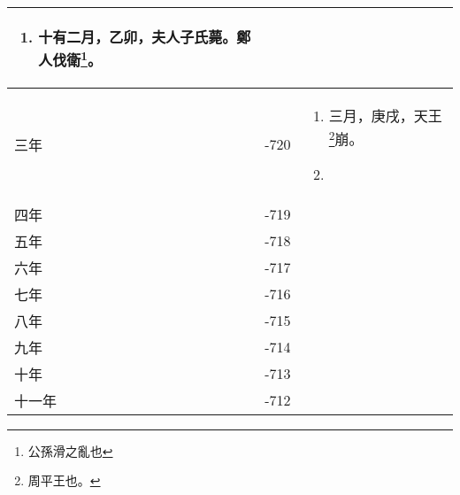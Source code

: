 \begin{longtable}{|>{\centering\scriptsize}m{2em}|>{\centering\scriptsize}m{1.3em}|>{\centering}m{8.8em}|}
\begin{enumerate}
  \item 十有二月，乙卯，夫人子氏薨。鄭人伐衛\footnote{公孫滑之亂也}。
  \end{enumerate} \tabularnewline\hline
  三年 & -720 & \begin{enumerate}
    \tiny
  \item 三月，庚戌，天王\footnote{周平王也。}崩。
  \item 
  \end{enumerate} \tabularnewline\hline
  四年 & -719 & \tabularnewline\hline
  五年 & -718 & \tabularnewline\hline
  六年 & -717 & \tabularnewline\hline
  七年 & -716 & \tabularnewline\hline
  八年 & -715 & \tabularnewline\hline
  九年 & -714 & \tabularnewline\hline
  十年 & -713 & \tabularnewline\hline
  十一年 & -712 & \tabularnewline
  \bottomrule
\end{longtable}



